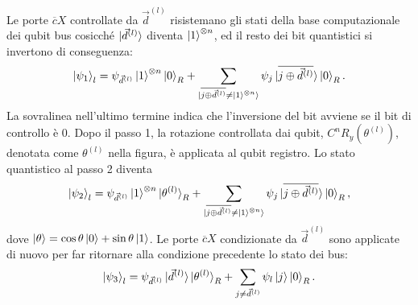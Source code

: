 Le porte $\overline{c}X$ controllate da $\vec{d}^{(l)}$ risistemano gli stati 
della base computazionale dei qubit bus cosicché $\ket{\vec{d}^{(l)}}$ diventa 
$\ket{1}^{\otimes n}$, ed il resto dei bit quantistici si invertono di conseguenza: 
\begin{equation}
    \ket{\psi_1}_l = \psi_{\vec{d}^{(l)}}\ket{1}^{\otimes n} \ket{0}_R + 
    \sum_{\ket{\overline{j \oplus \vec{d}^{(l)}} \neq \ket{1}^{\otimes n} }} \psi_j \ket{\overline{j \oplus \vec{d}^{(l)}}} 
    \ket{0}_R.
\end{equation}
La sovralinea nell'ultimo termine indica che l'inversione del bit avviene se il 
bit di controllo è 0. Dopo il passo 1, la rotazione controllata dai qubit, 
$C^n R_y(\theta^{(l)})$, denotata come $\theta^{(l)}$ nella figura, è applicata 
al qubit registro. Lo stato quantistico al passo 2 diventa 
\begin{equation}
    \ket{\psi_2}_l = \psi_{\vec{d}^{(l)}} \ket{1}^{\otimes n} \ket{\theta^{(l)}}_R + 
    \sum_{\ket{\overline{j \oplus \vec{d}^{(l)}} \neq \ket{1}^{\otimes n} }} \psi_j \ket{\overline{j \oplus \vec{d}^{(l)}}} 
    \ket{0}_R,
\end{equation}
dove $\ket{\theta}=\cos\theta\ket{0}+\sin\theta\ket{1}$. 
Le porte $\overline{c}X$ condizionate da $\vec{d}^{(l)}$ sono applicate di nuovo 
per far ritornare alla condizione precedente lo stato dei bus: 
\begin{equation}
    \ket{\psi_3}_l = \psi_{\vec{d}^{(l)}} \ket{\vec{d}^{(l)}} \ket{\theta^{(l)}}_R + 
    \sum_{j \neq \vec{d}^{(l)}} \psi_l \ket{j} \ket{0}_R.
\end{equation}

